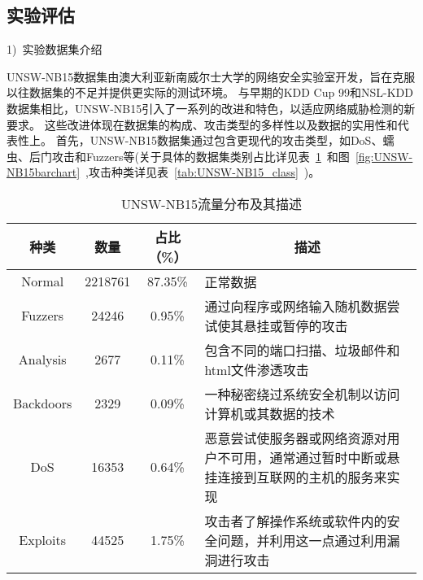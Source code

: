 \subsection{实验评估}
1)~实验数据集介绍\par
UNSW-NB15数据集\cite{moustafa2015comprehensive}由澳大利亚新南威尔士大学的网络安全实验室开发，旨在克服以往数据集的不足并提供更实际的测试环境。
与早期的KDD Cup 99和NSL-KDD数据集相比，UNSW-NB15引入了一系列的改进和特色，以适应网络威胁检测的新要求。
这些改进体现在数据集的构成、攻击类型的多样性以及数据的实用性和代表性上。
首先，UNSW-NB15数据集通过包含更现代的攻击类型，如DoS、蠕虫、后门攻击和Fuzzers等(关于具体的数据集类别占比详见表~\ref{tab:UNSW-NB15_distribution}~和图~\ref{fig:UNSW-NB15barchart}~,攻击种类详见表~\ref{tab:UNSW-NB15_class}~)。
\begin{table}[h]
	\caption{UNSW-NB15流量分布及其描述}
	\label{tab:UNSW-NB15_distribution}
	\begin{tabularx}{\textwidth}{@{}cccX@{}}
		\toprule
		\multicolumn{1}{c}{\textbf{种类}} & \multicolumn{1}{c}{\textbf{数量}} & \multicolumn{1}{c}{\textbf{占比（\%）}} & \multicolumn{1}{c}{\textbf{描述}}                  \\
		\midrule
		Normal                          & 2218761                         & 87.35\%                             & 正常数据                                             \\

		Fuzzers                         & 24246                           & 0.95\%                              & 通过向程序或网络输入随机数据尝试使其悬挂或暂停的攻击                       \\

		Analysis                        & 2677                            & 0.11\%                              & 包含不同的端口扫描、垃圾邮件和html文件渗透攻击                        \\

		Backdoors                       & 2329                            & 0.09\%                              & 一种秘密绕过系统安全机制以访问计算机或其数据的技术                        \\

		DoS                             & 16353                           & 0.64\%                              & 恶意尝试使服务器或网络资源对用户不可用，通常通过暂时中断或悬挂连接到互联网的主机的服务来实现   \\

		Exploits                        & 44525                           & 1.75\%                              & 攻击者了解操作系统或软件内的安全问题，并利用这一点通过利用漏洞进行攻击              \\


\end{tabularx}
\end{table}
